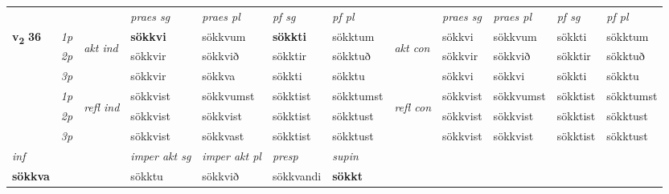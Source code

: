 \begin{longtable}[l]{X>{\footnotesize\itshape}llXXXXlXXXX}
 & &   & \textit{praes sg}  & \textit{praes pl}    & \textit{ pf sg} & \textit{pf pl} & & \textit{praes sg}  & \textit{praes pl}    & \textit{pf sg} & \textit{pf pl }  \\ \cmidrule{4-7} \cmidrule{9-12}
 \multirow{2}{*}{{{\textbf{v{\textsubscript{2}}} \Large{\textbf{36}}}}}  & 1p & \multirow{3}{*}{\begin{turn}{90}\textit{akt ind}\end{turn}} & \textbf{sökkvi} & sökkvum & \textbf{sökkti} & sökktum & \multirow{3}{*}{\begin{turn}{90}\textit{akt con}\end{turn}} &sökkvi & sökkvum & sökkti & sökktum\\*
 & 2p &  &  sökkvir  & sökkvið & sökktir & sökktuð & & sökkvir & sökkvið & sökktir & sökktuð \\*
 & 3p &  & sökkvir & sökkva & sökkti & sökktu & & sökkvi & sökkvi& sökkti & sökktu \\*
\cmidrule{4-7} \cmidrule{9-12}
 & 1p & \multirow{3}{*}{\begin{turn}{90}\textit{refl ind}\end{turn}}  & sökkvist & sökkvumst & sökktist & sökktumst & \multirow{3}{*}{\begin{turn}{90}\textit{refl con}\end{turn}}  &sökkvist & sökkvumst & sökktist & sökktumst \\*
 & 2p &  & sökkvist & sökkvist & sökktist & sökktust & &sökkvist & sökkvist & sökktist & sökktust \\*
 & 3p  & & sökkvist & sökkvast & sökktist & sökktust & & sökkvist & sökkvist& sökktist & sökktust \\*
\cmidrule{4-7} \cmidrule{9-12}

   {\textit{inf}} & &  & \textit{imper akt sg} & \textit{imper akt pl}   & \textit{presp} & \textit{supin}   \\*
  {\textbf{sökkva}} & && sökktu  & sökkvið   & sökkvandi &  \textbf{sökkt}   \\*

\midrule


\end{longtable}

